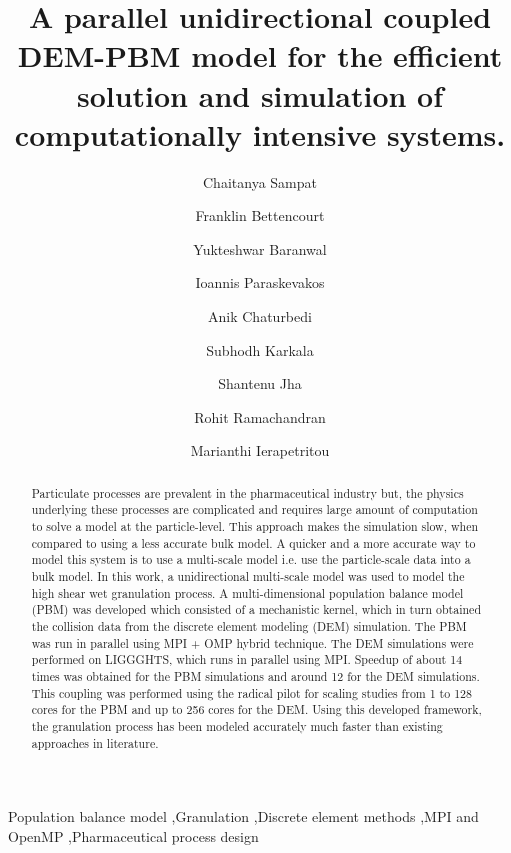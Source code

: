 \documentclass[preprint,11pt,authoryear]{elsarticle}
\begin{document}
\begin{frontmatter}

\title{A parallel unidirectional coupled DEM-PBM model for the efficient solution and simulation of 
computationally  intensive systems.}
\author[add1]{Chaitanya Sampat}
\author[add1]{Franklin Bettencourt}
\author[add1]{Yukteshwar Baranwal}
\author[add2]{Ioannis Paraskevakos}
\author[add1]{Anik Chaturbedi}
\author[add1]{Subhodh Karkala}
\author[add2]{Shantenu Jha}
\author[add1]{Rohit Ramachandran}
\author[add1]{Marianthi Ierapetritou}
\address[add1]{Department of Chemical and Biochemical Engineering, Rutgers, The State University of New
Jersey, Piscataway, NJ, USA-08854}
\address[add2]{Electrical and Computer Engineering, Rutgers, The State University of New Jersey, 
Piscataway, NJ, USA-08854}

\begin{abstract}
Particulate processes are prevalent in the pharmaceutical industry but, the physics underlying 
these processes are complicated and requires large amount of computation to solve a model at the
particle-level. This approach makes the simulation slow, when compared to using a less accurate 
bulk model. A quicker and a more accurate way to model this system is to use a multi-scale 
model i.e. use the particle-scale data into a bulk model. 
In this work, a unidirectional multi-scale model was used to model the high shear wet granulation 
process. A multi-dimensional population balance model (PBM) was developed which 
consisted of a mechanistic kernel, which in turn obtained the collision data from the discrete element 
modeling (DEM) simulation. The PBM was run in parallel using MPI + OMP hybrid technique. The DEM 
simulations were performed on
LIGGGHTS, which runs in parallel using MPI. Speedup of about 14 times was obtained for the PBM 
simulations and around 12 for the DEM simulations. This coupling was performed using the radical 
pilot for scaling studies from 1 to 128 cores for the PBM and up to 256 cores for the DEM. Using 
this developed framework, the granulation process has been modeled accurately 
much faster than existing approaches in literature.
\end{abstract}
\begin{keyword}
Population balance model \sep Granulation \sep Discrete element methods  \sep MPI and OpenMP 
\sep Pharmaceutical process design
\end{keyword}
\end{frontmatter}
\linenumbers
\end{document}
